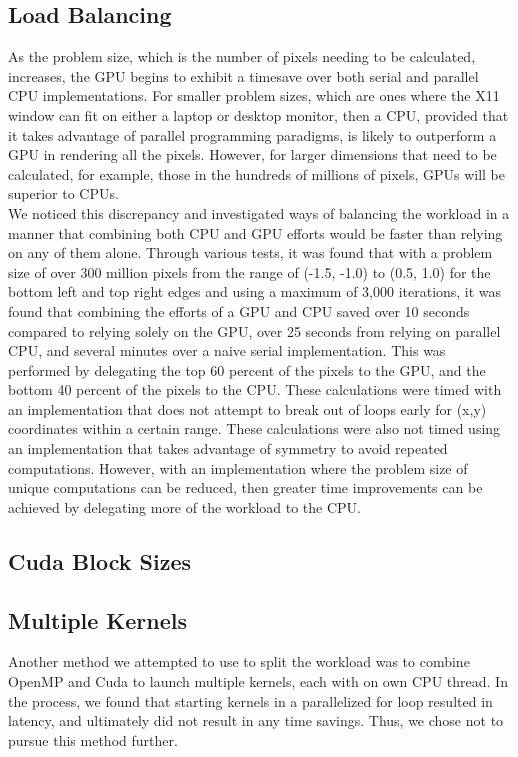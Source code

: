 \documentclass{article}
\begin{document}
\subsection{Load Balancing}

As the problem size, which is the number of pixels needing to be calculated, increases, the GPU begins to exhibit a timesave over both serial and parallel CPU implementations. For smaller problem sizes, which are ones where the X11 window can fit on either a laptop or desktop monitor, then a CPU, provided that it takes advantage of parallel programming paradigms, is likely to outperform a GPU in rendering all the pixels. However, for larger dimensions that need to be calculated, for example, those in the hundreds of millions of pixels, GPUs will be superior to CPUs.\\

We noticed this discrepancy and investigated ways of balancing the workload in a manner that combining both CPU and GPU efforts would be faster than relying on any of them alone. Through various tests, it was found that with a problem size of over 300 million pixels from the range of (-1.5, -1.0) to (0.5, 1.0) for the bottom left and top right edges and using a maximum of 3,000 iterations, it was found that combining the efforts of a GPU and CPU saved over 10 seconds compared to relying solely on the GPU, over 25 seconds from relying on parallel CPU, and several minutes over a naive serial implementation. This was performed by delegating the top 60 percent of the pixels to the GPU, and the bottom 40 percent of the pixels to the CPU. These calculations were timed with an implementation that does not attempt to break out of loops early for (x,y) coordinates within a certain range. These calculations were also not timed using an implementation that takes advantage of symmetry to avoid repeated computations. However, with an implementation where the problem size of unique computations can be reduced, then greater time improvements can be achieved by delegating more of the workload to the CPU.

\subsection{Cuda Block Sizes}

\subsection{Multiple Kernels}

Another method we attempted to use to split the workload was to combine OpenMP and Cuda to launch multiple kernels, each with on own CPU thread. In the process, we found that starting kernels in a parallelized for loop resulted in latency, and ultimately did not result in any time savings. Thus, we chose not to pursue this method further.
\end{document}
